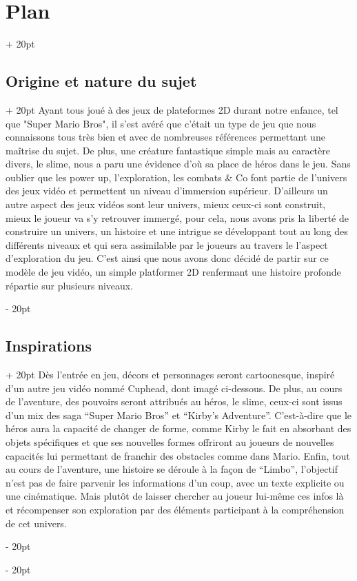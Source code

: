 \documentclass[a4paper, 12pt, twoside]{article}
\newcommand{\ind}[1][20pt]{\advance\leftskip + #1}
\newcommand{\deind}[1][20pt]{\advance\leftskip - #1}
\newenvironment{indt}[2][20pt]{#2 \par \ind[#1]}{\par \deind} %
\begin{document}
    \begin{indt}{\section{Plan}}
        \begin{indt}{\subsection{Origine et nature du sujet}}
            Ayant tous joué à des jeux de plateformes 2D durant notre enfance, tel que "Super Mario Bros", il s'est avéré que c'était un type de jeu que nous connaissons tous très bien et avec de nombreuses références permettant une maîtrise du sujet. De plus, une créature fantastique simple mais au caractère divers, le slime, nous a paru une évidence d'où sa place de héros dans le jeu. Sans oublier que les power up, l'exploration, les combats $\&$ Co font partie de l'univers des jeux vidéo et permettent un niveau d'immersion supérieur. D'ailleurs un autre aspect des jeux vidéos sont leur univers, mieux ceux-ci sont construit, mieux le joueur va s'y retrouver immergé, pour cela, nous avons pris la liberté de construire un univers, un histoire et une intrigue se développant tout au long des différents niveaux et qui sera assimilable par le joueurs au travers le l'aspect d'exploration du jeu. C'est ainsi que nous avons donc décidé de partir sur ce modèle de jeu vidéo, un simple platformer 2D renfermant une histoire profonde répartie sur plusieurs niveaux.
        \end{indt}

        \begin{indt}{\subsection{Inspirations}}
            Dès l'entrée en jeu, décors et personnages seront cartoonesque, inspiré d'un autre jeu vidéo nommé Cuphead, dont imagé ci-dessous. De plus, au cours de l'aventure, des pouvoirs seront attribués au héros, le slime, ceux-ci sont issus d'un mix des saga “Super Mario Bros” et “Kirby's Adventure”. C'est-à-dire que le héros aura la capacité de changer de forme, comme Kirby le fait en absorbant des objets spécifiques et que ses nouvelles formes offriront au joueurs de nouvelles capacités lui permettant de franchir des obstacles comme dans Mario. Enfin, tout au cours de l'aventure, une histoire se déroule à la façon de “Limbo”, l'objectif n'est pas de faire parvenir les informations d'un coup, avec un texte explicite ou une cinématique. Mais plutôt de laisser chercher au joueur lui-même ces infos là et récompenser son exploration par des éléments participant à la compréhension de cet univers.
        \end{indt}


\end{indt}
\end{document}
